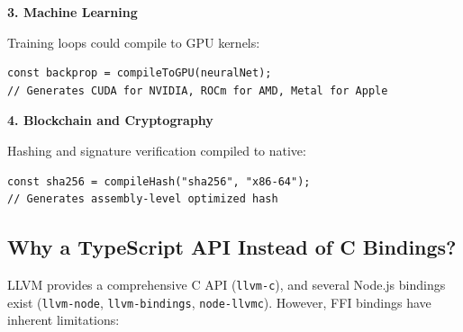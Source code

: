 \documentclass[11pt]{article}
\begin{document}
\textbf{3. Machine Learning}

Training loops could compile to GPU kernels:
\begin{lstlisting}[style=ts]
const backprop = compileToGPU(neuralNet);
// Generates CUDA for NVIDIA, ROCm for AMD, Metal for Apple
\end{lstlisting}

\textbf{4. Blockchain and Cryptography}

Hashing and signature verification compiled to native:
\begin{lstlisting}[style=ts]
const sha256 = compileHash("sha256", "x86-64");
// Generates assembly-level optimized hash
\end{lstlisting}

\subsection{Why a TypeScript API Instead of C Bindings?}

LLVM provides a comprehensive C API (\texttt{llvm-c}), and several Node.js bindings exist (\texttt{llvm-node}\cite{llvmnode}, \texttt{llvm-bindings}\cite{llvmbindings}, \texttt{node-llvmc}\cite{nodellvmc}). However, FFI bindings have inherent limitations:
\end{document}
